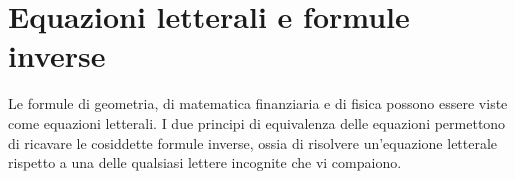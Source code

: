 % 
% 

\section{Equazioni letterali e formule inverse}
\label{sec:compl1_formuleinverse}

Le formule di geometria, di matematica finanziaria e di fisica possono essere 
viste come equazioni letterali.
I due principi di equivalenza delle equazioni permettono di ricavare le 
cosiddette formule inverse, ossia di risolvere
un'equazione letterale rispetto a una delle qualsiasi lettere incognite che vi 
compaiono.

